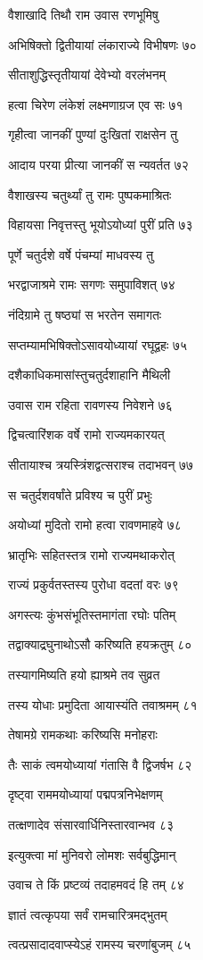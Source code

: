 वैशाखादि तिथौ राम उवास रणभूमिषु

अभिषिक्तो द्वितीयायां लंकाराज्ये विभीषणः ७०

सीताशुद्धिस्तृतीयायां देवेभ्यो वरलंभनम्

हत्वा चिरेण लंकेशं लक्ष्मणाग्रज एव सः ७१

गृहीत्वा जानकीं पुण्यां दुःखितां राक्षसेन तु

आदाय परया प्रीत्या जानकीं स न्यवर्तत ७२

वैशाखस्य चतुर्थ्यां तु रामः पुष्पकमाश्रितः

विहायसा निवृत्तस्तु भूयोऽयोध्यां पुरीं प्रति ७३

पूर्णे चतुर्दशे वर्षे पंचम्यां माधवस्य तु

भरद्वाजाश्रमे रामः सगणः समुपाविशत् ७४

नंदिग्रामे तु षष्ठ्यां स भरतेन समागतः

सप्तम्यामभिषिक्तोऽसावयोध्यायां रघूद्वहः ७५

दशैकाधिकमासांस्तुचतुर्दशाहानि मैथिली

उवास राम रहिता रावणस्य निवेशने ७६

द्विचत्वारिंशक वर्षे रामो राज्यमकारयत्

सीतायाश्च त्रयस्त्रिंशद्वत्सराश्च तदाभवन् ७७

स चतुर्दशवर्षांते प्रविश्य च पुरीं प्रभुः

अयोध्यां मुदितो रामो हत्वा रावणमाहवे ७८

भ्रातृभिः सहितस्तत्र रामो राज्यमथाकरोत्

राज्यं प्रकुर्वतस्तस्य पुरोधा वदतां वरः ७९

अगस्त्यः कुंभसंभूतिस्तमागंता रघोः पतिम्

तद्वाक्याद्रघुनाथोऽसौ करिष्यति हयक्रतुम् ८०

तस्यागमिष्यति हयो ह्याश्रमे तव सुव्रत

तस्य योधाः प्रमुदिता आयास्यंति तवाश्रमम् ८१

तेषामग्रे रामकथाः करिष्यसि मनोहराः

तैः साकं त्वमयोध्यायां गंतासि वै द्विजर्षभ ८२

दृष्ट्वा राममयोध्यायां पद्मपत्रनिभेक्षणम्

तत्क्षणादेव संसारवार्धिनिस्तारवान्भव ८३

इत्युक्त्वा मां मुनिवरो लोमशः सर्वबुद्धिमान्

उवाच ते किं प्रष्टव्यं तदाहमवदं हि तम् ८४

ज्ञातं त्वत्कृपया सर्वं रामचारित्रमद्भुतम्

त्वत्प्रसादादवाप्स्येऽहं रामस्य चरणांबुजम् ८५

